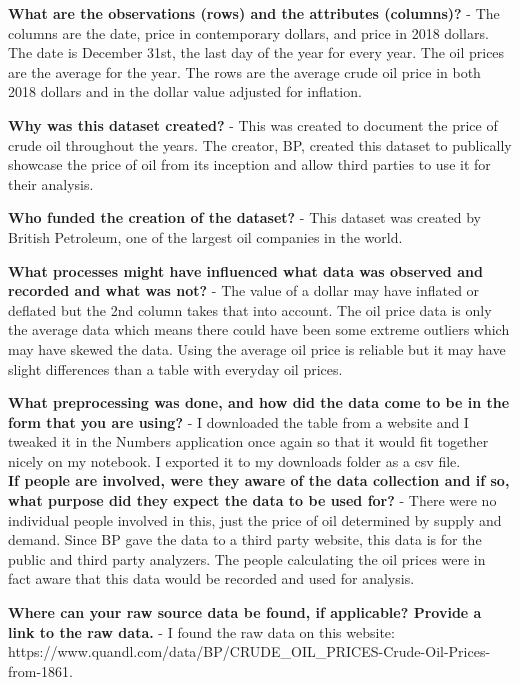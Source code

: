 \documentclass[11pt]{article}
\begin{document}
    \textbf{What are the observations (rows) and the attributes (columns)?}
- The columns are the date, price in contemporary dollars, and price in
2018 dollars. The date is December 31st, the last day of the year for
every year. The oil prices are the average for the year. The rows are
the average crude oil price in both 2018 dollars and in the dollar value
adjusted for inflation.

\textbf{Why was this dataset created?} - This was created to document
the price of crude oil throughout the years. The creator, BP, created
this dataset to publically showcase the price of oil from its inception
and allow third parties to use it for their analysis.

\textbf{Who funded the creation of the dataset?} - This dataset was
created by British Petroleum, one of the largest oil companies in the
world.

\textbf{What processes might have influenced what data was observed and
recorded and what was not?} - The value of a dollar may have inflated or
deflated but the 2nd column takes that into account. The oil price data
is only the average data which means there could have been some extreme
outliers which may have skewed the data. Using the average oil price is
reliable but it may have slight differences than a table with everyday
oil prices.

\textbf{What preprocessing was done, and how did the data come to be in
the form that you are using?} - I downloaded the table from a website
and I tweaked it in the Numbers application once again so that it would
fit together nicely on my notebook. I exported it to my downloads folder
as a csv file.\\
\textbf{If people are involved, were they aware of the data collection
and if so, what purpose did they expect the data to be used for?} -
There were no individual people involved in this, just the price of oil
determined by supply and demand. Since BP gave the data to a third party
website, this data is for the public and third party analyzers. The
people calculating the oil prices were in fact aware that this data
would be recorded and used for analysis.

\textbf{Where can your raw source data be found, if applicable? Provide
a link to the raw data.} - I found the raw data on this website:
https://www.quandl.com/data/BP/CRUDE\_OIL\_PRICES-Crude-Oil-Prices-from-1861.
\end{document}
